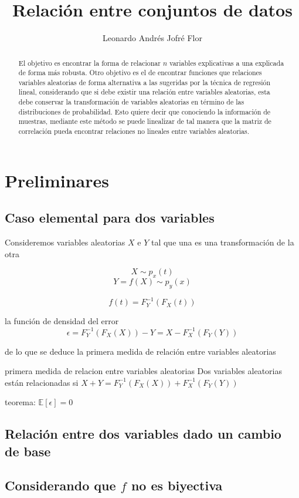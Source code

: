 \documentclass{article}
\title{Relación entre conjuntos de datos}
\author{Leonardo Andrés Jofré Flor}
\begin{document}
\maketitle

\begin{abstract}
El objetivo es encontrar la forma de relacionar $n$ variables explicativas a una explicada de forma más robusta. Otro objetivo es el de encontrar funciones que relaciones variables aleatorias de forma alternativa a las sugeridas por la técnica de regresión lineal, considerando que si debe existir una relación entre variables aleatorias, esta debe conservar la transformación de variables aleatorias en término de las distribuciones de probabilidad. Esto quiere decir que conociendo la información de muestras, mediante este método se puede linealizar de tal manera que la matriz de correlación pueda encontrar relaciones no lineales entre variables aleatorias.
\end{abstract}


\section{Preliminares}

\subsection{Caso elemental para dos variables}

Consideremos variables aleatorias $X$ e $Y$ tal que una es una transformación de la otra

$$X\sim p_x(t)$$
$$Y = f(X)\sim p_y(x)$$

$$f(t) = F^{-1}_Y(F_X(t))$$

la función de densidad del error 
$$\epsilon = F^{-1}_Y(F_X(X))-Y = X - F^{-1}_X(F_Y(Y))$$

de lo que se deduce la primera medida de relación entre variables aleatorias

primera medida de relacion entre variables aleatorias
Dos variables aleatorias están relacionadas si
$X+Y = F^{-1}_Y(F_X(X)) + F^{-1}_X(F_Y(Y))$

teorema: $\mathbb{E}\left[ \epsilon \right] = 0$

\subsection{Relación entre dos variables dado un cambio de base}

\subsection{Considerando que $f$ no es biyectiva}
\end{document}
